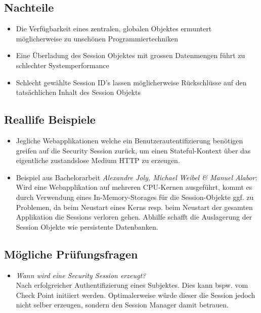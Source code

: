 \subsection*{Nachteile}
\begin{itemize}
	\item Die Verfügbarkeit eines zentralen, globalen Objektes ermuntert möglicherweise zu unschönen Programmiertechniken
	\item Eine Überladung des Session Objektes mit grossen Datenmengen führt zu schlechter Systemperformance
	\item Schlecht gewählte Session ID's lassen möglicherweise Rückschlüsse auf den tatsächlichen Inhalt des Session Objekts
\end{itemize}

\subsection*{Reallife Beispiele}
\begin{itemize}
	\item Jegliche Webapplikationen welche ein Benutzerautentifizierung benötigen greifen auf die Security Session zurück, um einen Stateful-Kontext über das eigentliche zustandslose Medium HTTP zu erzeugen.
	\item Beispiel aus Bachelorarbeit \emph{Alexandre Joly, Michael Weibel \& Manuel Alabor}:\\
	Wird eine Webapplikation auf mehreren CPU-Kernen ausgeführt, kommt es durch Verwendung eines In-Memory-Storages für die Session-Objekte ggf. zu Problemen, da beim Neustart eines Kerns resp. beim Neustart der gesamten Applikation die Sessions verloren gehen. Abhilfe schafft die Auslagerung der Session Objekte wie persistente Datenbanken.
\end{itemize}


\subsection*{Mögliche Prüfungsfragen}
\begin{itemize}
	\item \emph{Wann wird eine Security Session erzeugt?}\\
	Nach erfolgreicher Authentifizierung eines Subjektes. Dies kann bspw. vom Check Point initiiert werden. Optimalerweise würde dieser die Session jedoch nicht selber erzeugen, sondern den Session Manager damit betrauen.
\end{itemize}